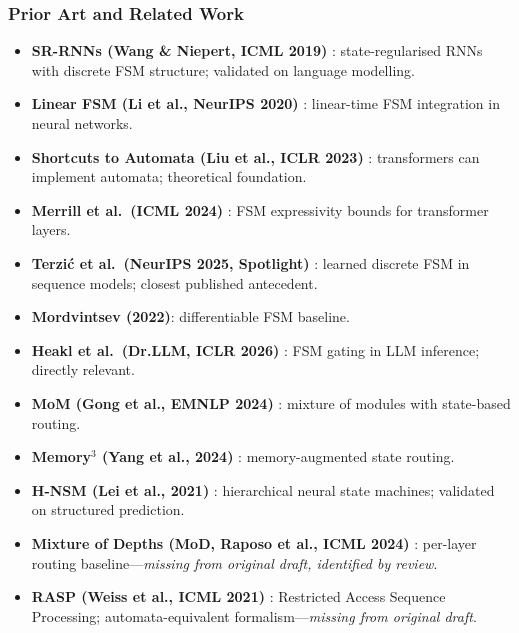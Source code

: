 \documentclass[11pt]{article}
\begin{document}
\subsubsection*{Prior Art and Related Work}
\begin{itemize}
  \item \textbf{SR-RNNs (Wang \& Niepert, ICML 2019)} \cite{WangNiepert2019}: state-regularised RNNs with discrete FSM structure; validated on language modelling.

  \item \textbf{Linear FSM (Li et al., NeurIPS 2020)} \cite{LiEtAl2020LinearFSM}: linear-time FSM integration in neural networks.

  \item \textbf{Shortcuts to Automata (Liu et al., ICLR 2023)} \cite{LiuEtAl2023Shortcuts}: transformers can implement automata; theoretical foundation.

  \item \textbf{Merrill et al.\ (ICML 2024)} \cite{MerrillEtAl2024}: FSM expressivity bounds for transformer layers.

  \item \textbf{Terzić et al.\ (NeurIPS 2025, Spotlight)} \cite{TerzicEtAl2025}: learned discrete FSM in sequence models; closest published antecedent.

  \item \textbf{Mordvintsev (2022)}: differentiable FSM baseline.

  \item \textbf{Heakl et al.\ (Dr.LLM, ICLR 2026)} \cite{HeaklEtAl2026}: FSM gating in LLM inference; directly relevant.

  \item \textbf{MoM (Gong et al., EMNLP 2024)} \cite{GongEtAl2024MoM}: mixture of modules with state-based routing.

  \item \textbf{Memory$^3$ (Yang et al., 2024)} \cite{YangEtAl2024Memory3}: memory-augmented state routing.

  \item \textbf{H-NSM (Lei et al., 2021)} \cite{LeiEtAl2021}: hierarchical neural state machines; validated on structured prediction.

  \item \textbf{Mixture of Depths (MoD, Raposo et al., ICML 2024)} \cite{RaposoEtAl2024}: per-layer routing baseline---\emph{missing from original draft, identified by review}.

  \item \textbf{RASP (Weiss et al., ICML 2021)} \cite{WeissEtAl2021}: Restricted Access Sequence Processing; automata-equivalent formalism---\emph{missing from original draft}.
\end{itemize}
\end{document}
